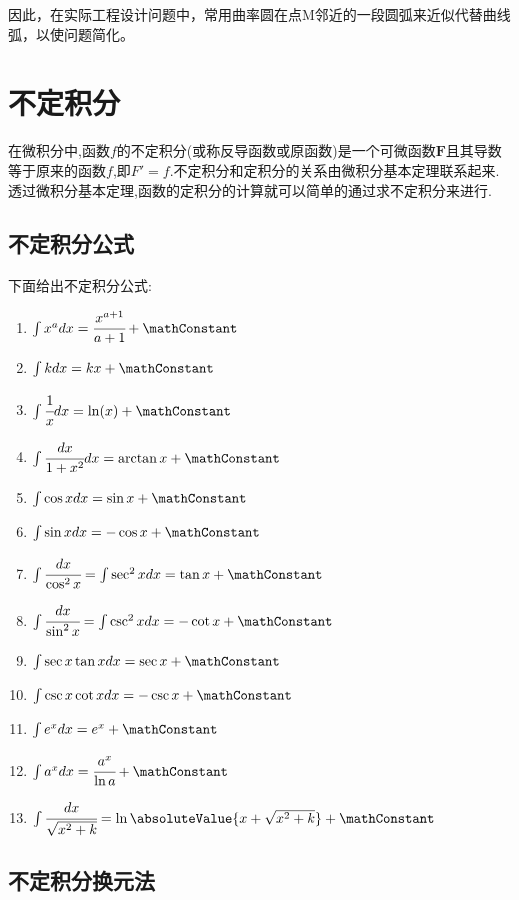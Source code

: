 {{{  因此，在实际工程设计问题中，常用曲率圆在点M邻近的一段圆弧来近似代替曲线弧，以使问题简化。
}%

}%

\section{不定积分}{
  在微积分中,函数$f$的不定积分(或称反导函数或原函数)是一个可微函数$\mathbf{F}$且其导数等于原来的函数$f$,即$F\prime = f$.不定积分和定积分的关系由微积分基本定理联系起来.透过微积分基本定理,函数的定积分的计算就可以简单的通过求不定积分来进行.

  \subsection{不定积分公式}{
    下面给出不定积分公式:

    \begin{enumerate}
      \item $\int x^adx = \cfrac{x^{a+1}}{a+1} + \mathConstant$
      \item $\int kdx = kx + \mathConstant$
      \item $\int \cfrac{1}{x}dx = \ln(x) + \mathConstant$
      \item $\int \cfrac{dx}{1+x^2}dx = \arctan x + \mathConstant$
      \item $\int \cos xdx = \sin x + \mathConstant$
      \item $\int \sin xdx = -\cos x + \mathConstant$
      \item $\int \cfrac{dx}{\cos^2x} = \int \sec^2xdx = \tan x + \mathConstant$
      \item $\int \cfrac{dx}{\sin^2x} = \int\csc^2xdx = -\cot x + \mathConstant$
      \item $\int \sec x\tan xdx = \sec x + \mathConstant$
      \item $\int \csc x\cot xdx = -\csc x + \mathConstant$
      \item $\int e^xdx = e^x + \mathConstant$
      \item $\int a^xdx = \cfrac{a^x}{\ln a} + \mathConstant$
      \item $\int \cfrac{dx}{\sqrt{x^2 + k}} = \ln\absoluteValue{x + \sqrt{x^2 + k}} + \mathConstant$
    \end{enumerate}

  }%

  \subsection{不定积分换元法}{
}}}
